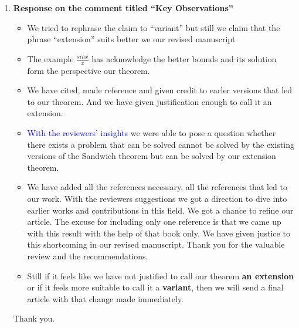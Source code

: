 \documentclass[a4paper,twoside,12pt]{article}
\begin{document}
\begin{enumerate}
\item \textbf{Response on the comment titled ``Key Observations'' } \\[2mm]
  \begin{itemize}
  \item We tried to rephrase the claim to ``variant'' but still we claim that the phrase ``extension'' suits better we our revised manuscript
    \vspace{5mm}

  \item The example $\frac{sinx}{x}$ has acknowledge the better bounds and its solution form the perspective our theorem.

    \vspace{5mm}
  \item We have cited, made reference and given credit to earler versions that led to our theorem. And we have given justification enough to call it an extension.
    \vspace{7mm}
 \item \textcolor{blue}{With the reviewers' insights} we were able to pose a question whether there exists a problem that can be solved cannot be solved by the existing versions of the Sandwich theorem but can be solved by our extension theorem.

 \vspace{7mm}
\item We have added all the references necessary, all the references that led to our work. With the reviewers suggestions we got a direction to dive into earlier works and contributions in this field. We got a chance to refine our article. The excuse for including only one reference is that we came up with this result with the help of that book only. We have given justice to this shortcoming in our revised manuscript. Thank you for the valuable review and the recommendations.

 \vspace{7mm}
\item Still if it feels like we have not justified to call our theorem \textbf{an extension} or if it feels more suitable to call it a \textbf{variant}, then we will send a final article with that change made immediately.
\end{itemize}

 \vspace{9mm}

  \begin{center}
    \LARGE Thank you.
  \end{center}
\end{enumerate}
\end{document}
